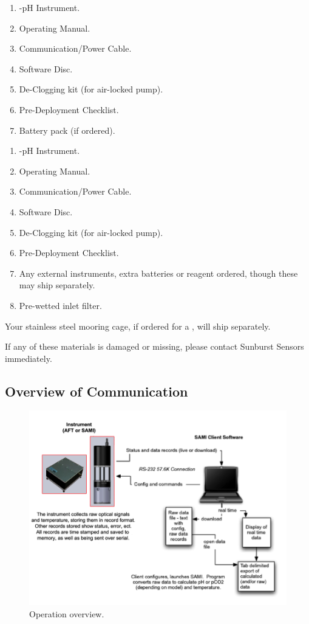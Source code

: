 \ifiSAMI
    \begin{enumerate}
    \item \instType{}-pH Instrument.
    \item \instType{} Operating Manual.
    \item Communication/Power Cable.
    \item \instType{} Software Disc.
    \item De-Clogging kit (for air-locked pump).
    \item Pre-Deployment Checklist.
    \item Battery pack (if ordered).
    \end{enumerate}
\else
    \begin{enumerate}
    \item \instType{}-pH Instrument.
    \item \instType{} Operating Manual.
    \item Communication/Power Cable.
    \item \instType{} Software Disc.
    \item De-Clogging kit (for air-locked pump).
    \item Pre-Deployment Checklist.
    \item Any external instruments, extra batteries or reagent ordered, though these may ship separately.
    \item Pre-wetted inlet filter.
    \end{enumerate}
    
    \noindent
    Your stainless steel mooring cage, if ordered for a \instType{}, will ship separately.
\fi

\noindent
If any of these materials is damaged or missing, please contact Sunburst Sensors immediately.


\subsection{Overview of Communication}

\begin{figure}[ht]
\centering
\includegraphics[width=1.0\textwidth]{figs/OperationFig.png}
\caption{Operation overview.}
\label{fig:OperationFig}
\end{figure}

